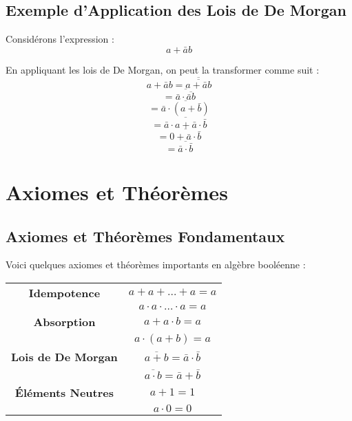 \documentclass[10pt,a4paper]{article}
\begin{document}
\subsection*{Exemple d'Application des Lois de De Morgan}

Considérons l'expression :
\[ a + \bar{a}b \]

En appliquant les lois de De Morgan, on peut la transformer comme suit :
\[ a + \bar{a}b = \overline{\overline{a + \bar{a}b}} \]
\[ = \overline{\bar{a} \cdot \overline{\bar{a}b}} \]
\[ = \overline{\bar{a} \cdot (a + \bar{b})} \]
\[ = \overline{\bar{a} \cdot a + \bar{a} \cdot \bar{b}} \]
\[ = \overline{0 + \bar{a} \cdot \bar{b}} \]
\[ = \overline{\bar{a} \cdot \bar{b}} \]


\section*{Axiomes et Théorèmes}

\subsection*{Axiomes et Théorèmes Fondamentaux}

Voici quelques axiomes et théorèmes importants en algèbre booléenne :

\begin{center}
    \begin{tabular}{|c|c|}
    \hline
    \textbf{Idempotence} & \( a + a + \ldots + a = a \) \\ & \( a \cdot a \cdot \ldots \cdot a = a \) \\
    \hline
    \textbf{Absorption} & \( a + a \cdot b = a \) \\ & \( a \cdot (a + b) = a \) \\
    \hline
    \textbf{Lois de De Morgan} & \( \overline{a + b} = \bar{a} \cdot \bar{b} \) \\ & \( \overline{a \cdot b} = \bar{a} + \bar{b} \) \\
    \hline
    \textbf{Éléments Neutres} & \( a + 1 = 1 \) \\ & \( a \cdot 0 = 0 \) \\
    \hline
    \end{tabular}
\end{center}
\end{document}
